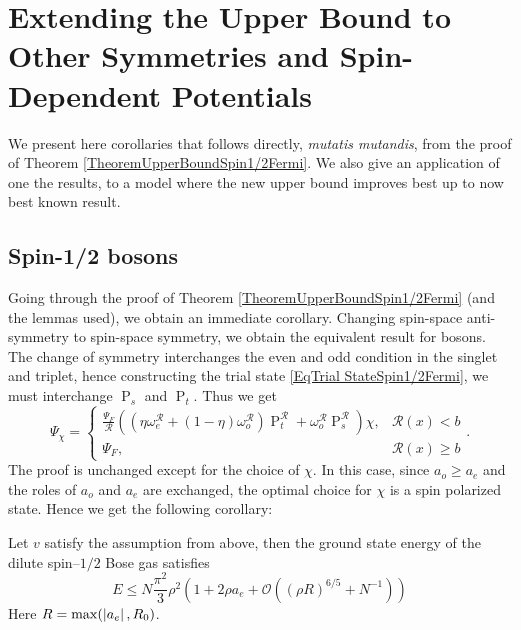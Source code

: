 \section{Extending the Upper Bound to Other Symmetries and Spin-Dependent Potentials}
We present here corollaries that follows directly, \emph{mutatis mutandis}, from the proof of Theorem \ref{TheoremUpperBoundSpin1/2Fermi}. We also give an application of one the results, to a model where the new upper bound improves best up to now best known result.
\subsection{Spin-1/2 bosons}
Going through the proof of Theorem \ref{TheoremUpperBoundSpin1/2Fermi} (and the lemmas used), we obtain an immediate corollary. Changing spin-space anti-symmetry to spin-space symmetry, we obtain the equivalent result for bosons. The change of symmetry interchanges the even and odd condition in the singlet and triplet, hence constructing the trial state \eqref{EqTrial StateSpin1/2Fermi}, we must interchange $ \operatorname{P}_s $ and $ \operatorname{P}_t $. Thus we get \begin{equation}\label{EqTrial StateSpin1/2Bose}
\Psi_\chi=\begin{cases}
\frac{\Psi_F}{\mathcal{R}}\left(\left(\eta\omega^{\mathcal{R}}_e+(1-\eta)\omega^{\mathcal{R}}_o\right)\operatorname{P}_t^{\mathcal{R}}+\omega_o^{\mathcal{R}}\operatorname{P}_s^{\mathcal{R}}\right)\chi,&\mathcal{R}(x)<b\\
\Psi_F,&\mathcal{R}(x)\geq b
\end{cases}.
\end{equation}
The proof is unchanged except for the choice of $ \chi $. In this case, since $ a_o\geq a_e $ and the roles of $ a_o $ and $ a_e $ are exchanged, the optimal choice for $ \chi $ is a spin polarized state. Hence we get the following corollary:
\begin{corollary}\label{CorollaryUpperBoundSpin1/2Bose}
	Let $ v $ satisfy the assumption from above, then the ground state energy of the dilute spin--$ 1/2 $ Bose gas satisfies\begin{equation}
		E\leq N\frac{\pi^2}{3}\rho^2\left(1+2\rho a_e+\mathcal{O}\left((\rho R)^{6/5}+N^{-1}\right)\right)
	\end{equation}
	Here $ R=\max(\left\lvert a_e \right\rvert, R_0) $.
\end{corollary}


